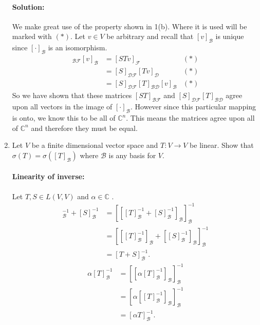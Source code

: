 \documentclass{article}
\begin{document}
\begin{enumerate}
      \paragraph{Solution: } 
      We make great use of the property shown in 1(b). Where it is used will be marked with $(*)$. Let $v\in V$ be arbitrary and recall that $[v]_{\mathcal{B}}$ is unique since $[\cdot ]_\mathcal{B}$ is an isomorphism. 
      \begin{align*}
          [ST]_{\mathcal{B}\mathcal{F}}[v]_\mathcal{B}&= [STv]_\mathcal{F}&(*) \\
                                              &= [S]_{\mathcal{D}\mathcal{F}}[Tv]_{\mathcal{D}}&(*) \\
                                              &= [S]_{\mathcal{D}\mathcal{F}}[T]_{\mathcal{B}\mathcal{D}}[v]_\mathcal{B}&(*) 
      \end{align*}
      So we have shown that these matrices $[ST]_{\mathcal{B}\mathcal{F}}$ and  $[S]_{\mathcal{DF}}[T]_{\mathcal{B}\mathcal{D}} $ agree upon all vectors in the image of $[\cdot ]_\mathcal{B}$. However since this particular mapping is onto, we know this to be all of  $\mathbb{C}^{n}$. This means the matrices agree upon all of $\mathbb{C}^{n}$ and therefore they must be equal. 
  \item Let $V$ be a finite dimensional vector space and $T : V \to V$ be linear. Show that $\sigma(T)=\sigma([T]_{\mathcal{B}})$ where $\mathcal{B}$ is any basis for $V$.
      \paragraph{Linearity of inverse:} 
      Let $T,S\in L(V,V)$ and $\alpha\in \mathbb{C}$ .
      \begin{align*}
          [T]_\mathcal{B}^{-1}+[S]_{\mathcal{B}}^{-1}&=
          [[[T]_\mathcal{B}^{-1}+[S]_{\mathcal{B}}^{-1}]_\mathcal{B}]_\mathcal{B}^{-1}\\
         &=[[[T]_\mathcal{B}^{-1}]_\mathcal{B}+[[S]_{\mathcal{B}}^{-1}]_\mathcal{B}]_\mathcal{B}^{-1}\\
         &=[T+S]_\mathcal{B}^{-1}
      .\end{align*}
      \begin{align*}
          \alpha[T]_\mathcal{B}^{-1}&= [[\alpha[T]_\mathcal{B}^{-1}]_\mathcal{B}]_\mathcal{B}^{-1} \\ 
                                    &= [\alpha[[T]_\mathcal{B}^{-1}]_\mathcal{B}]_\mathcal{B}^{-1} \\ 
                                    &= [\alpha T]_\mathcal{B}^{-1} 
      .\end{align*}

\end{enumerate}
\end{document}
